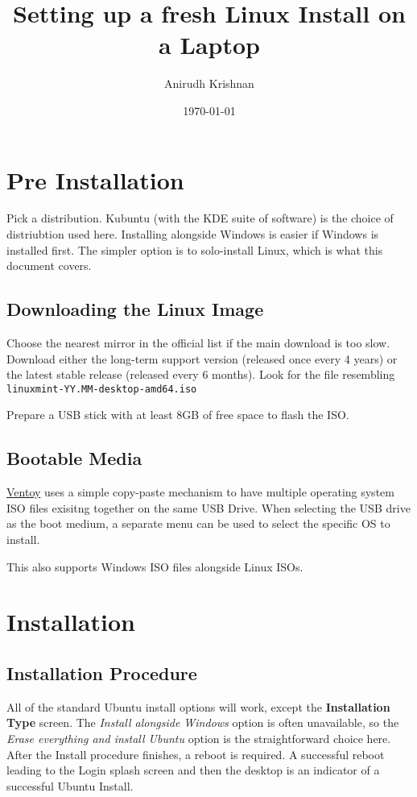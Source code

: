 \documentclass[8pt,a4paper]{article}
\title{Setting up a fresh Linux Install on a Laptop}
\author{Anirudh Krishnan}
\date{\today}
\begin{document}
\maketitle
\newpage

\tableofcontents
\newpage

\section{Pre Installation}

Pick a distribution. Kubuntu (with the KDE suite of software) is the choice of
distriubtion used here. Installing alongside Windows is easier if Windows is installed first.
The simpler option is to solo-install Linux, which is what this document covers.

\subsection{Downloading the Linux Image}
Choose the nearest mirror in the official list if the main download is too slow.
Download either the long-term support version (released once every 4 years) or the 
latest stable release (released every 6 months).
Look for the file resembling \texttt{linuxmint-YY.MM-desktop-amd64.iso}

Prepare a USB stick with at least 8GB of free space to flash the ISO.



\subsection{Bootable Media}
\href{https://www.ventoy.net/en/index.html}{Ventoy} uses a simple copy-paste mechanism to have 
multiple operating system ISO files exisitng together on the same USB Drive. When selecting the 
USB drive as the boot medium, a separate menu can be used to select the specific OS to install. 

This also supports Windows ISO files alongside Linux ISOs.


\section{Installation}

\subsection{Installation Procedure}
All of the standard Ubuntu install options will work, except the \textbf{Installation Type} screen.
The \textit{Install alongside Windows} option is often unavailable, so the \textit{Erase everything and install Ubuntu}
option is the straightforward choice here.
After the Install procedure finishes, a reboot is required.
A successful reboot leading to the Login splash screen and then the desktop is an indicator of a successful Ubuntu Install.
\end{document}
